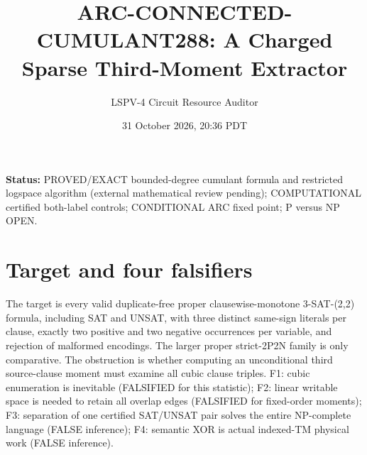 \documentclass[11pt]{article}
\title{ARC-CONNECTED-CUMULANT288: A Charged Sparse Third-Moment Extractor}
\author{LSPV-4 Circuit Resource Auditor}\date{31 October 2026, 20:36 PDT}
\begin{document}
\maketitle
\noindent\textbf{Status:} PROVED/EXACT bounded-degree cumulant formula and restricted logspace algorithm (external mathematical review pending); COMPUTATIONAL certified both-label controls; CONDITIONAL ARC fixed point; P versus NP OPEN.

\section*{Target and four falsifiers}
The target is every valid duplicate-free proper clausewise-monotone 3-SAT-(2,2) formula, including SAT and UNSAT, with three distinct same-sign literals per clause, exactly two positive and two negative occurrences per variable, and rejection of malformed encodings. The larger proper strict-2P2N family is only comparative. The obstruction is whether computing an unconditional third source-clause moment must examine all cubic clause triples. F1: cubic enumeration is inevitable (FALSIFIED for this statistic); F2: linear writable space is needed to retain all overlap edges (FALSIFIED for fixed-order moments); F3: separation of one certified SAT/UNSAT pair solves the entire NP-complete language (FALSE inference); F4: semantic XOR is actual indexed-TM physical work (FALSE inference).
\end{document}
